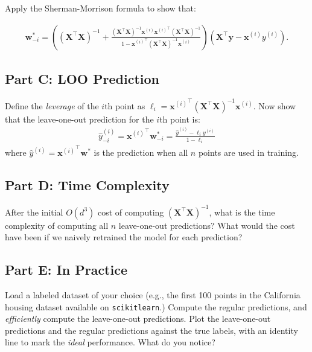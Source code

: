 \documentclass{article}
\begin{document}
Apply the Sherman-Morrison formula to show that:

\begin{align}
\mathbf{w}^*_{-i} 
= 
\left(\left(\mathbf{X}^\top \mathbf{X}\right)^{-1}
+ \frac{
\left(\mathbf{X}^\top \mathbf{X}\right)^{-1}
\mathbf{x}^{(i)} {\mathbf{x}^{(i)}}^\top
\left(\mathbf{X}^\top \mathbf{X}\right)^{-1}
}
{
1-{\mathbf{x}^{(i)}}^\top
\left(\mathbf{X}^\top \mathbf{X}\right)^{-1}
{\mathbf{x}^{(i)}}
}
\right)
\left(
\mathbf{X}^\top \mathbf{y}
- \mathbf{x}^{(i)} y^{(i)}
\right).
\end{align}

\subsection*{Part C: LOO Prediction}

Define the \textit{leverage} of the $i$th point as 
$\ell_i = {\mathbf{x}^{(i)}}^\top
\left(\mathbf{X}^\top \mathbf{X}\right)^{-1}
\mathbf{x}^{(i)}$.
Now show that the leave-one-out prediction for the $i$th point is:
\begin{align}
\hat{y}^{(i)}_{-i}
= {\mathbf{x}^{(i)}}^\top 
\mathbf{w}^*_{-i} 
= \frac{\hat{y}^{(i)} - \ell_i y^{(i)}}    
{1 - \ell_i}
\end{align}
where $\hat{y}^{(i)} = {\mathbf{x}^{(i)}}^\top 
\mathbf{w}^* $ is the prediction when all $n$ points are used in training.

\subsection*{Part D: Time Complexity}

After the initial $O(d^3)$ cost of computing $\left(\mathbf{X}^\top \mathbf{X}\right)^{-1}$,
what is the time complexity of computing all $n$ leave-one-out predictions?
What would the cost have been if we naively retrained the model for each prediction?

\subsection*{Part E: In Practice}

Load a labeled dataset of your choice (e.g., the first 100 points in the California housing dataset available on \texttt{scikitlearn}.)
Compute the regular predictions, and
\textit{efficiently} compute the leave-one-out predictions.
Plot the leave-one-out predictions and the regular predictions against the true labels, with an identity line to mark the \textit{ideal} performance.
What do you notice?

%
\end{document}
